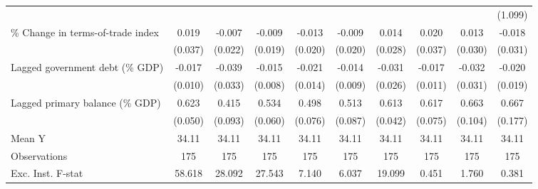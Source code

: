 {\begin{tabular}{l*{9}{c}}
                    &                     &                     &                     &                     &                     &                     &                     &                     &     (1.099)         \\
\addlinespace
\% Change in terms-of-trade index&       0.019         &      -0.007         &      -0.009         &      -0.013         &      -0.009         &       0.014         &       0.020         &       0.013         &      -0.018         \\
                    &     (0.037)         &     (0.022)         &     (0.019)         &     (0.020)         &     (0.020)         &     (0.028)         &     (0.037)         &     (0.030)         &     (0.031)         \\
\addlinespace
Lagged government debt (\% GDP)&      -0.017\sym{*}  &      -0.039         &      -0.015\sym{*}  &      -0.021         &      -0.014         &      -0.031         &      -0.017         &      -0.032         &      -0.020         \\
                    &     (0.010)         &     (0.033)         &     (0.008)         &     (0.014)         &     (0.009)         &     (0.026)         &     (0.011)         &     (0.031)         &     (0.019)         \\
\addlinespace
Lagged primary balance (\% GDP)&       0.623\sym{***}&       0.415\sym{***}&       0.534\sym{***}&       0.498\sym{***}&       0.513\sym{***}&       0.613\sym{***}&       0.617\sym{***}&       0.663\sym{***}&       0.667\sym{***}\\
                    &     (0.050)         &     (0.093)         &     (0.060)         &     (0.076)         &     (0.087)         &     (0.042)         &     (0.075)         &     (0.104)         &     (0.177)         \\
\midrule
Mean Y              &       34.11         &       34.11         &       34.11         &       34.11         &       34.11         &       34.11         &       34.11         &       34.11         &       34.11         \\
Observations        &         175         &         175         &         175         &         175         &         175         &         175         &         175         &         175         &         175         \\
Exc. Inst. F-stat   &      58.618         &      28.092         &      27.543         &       7.140         &       6.037         &      19.099         &       0.451         &       1.760         &       0.381         \\
\bottomrule
\end{tabular}
}

